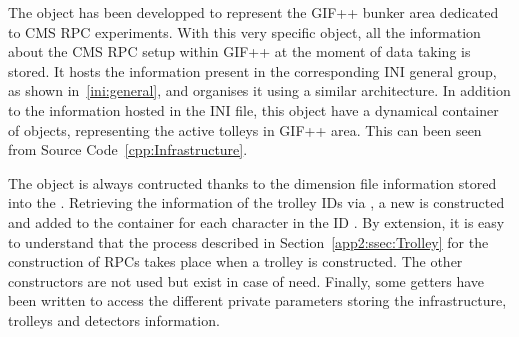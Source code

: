 	The  object has been developped to represent the GIF++ bunker area dedicated to CMS RPC experiments. With this very specific object, all the information about the CMS RPC setup within GIF++ at the moment of data taking is stored. It hosts the information present in the corresponding INI general group, as shown in~\ref{ini:general}, and organises it using a similar architecture. In addition to the information hosted in the INI file, this object have a dynamical container of  objects, representing the active tolleys in GIF++ area. This can been seen from Source Code~\ref{cpp:Infrastructure}.
	
	The  object is always contructed thanks to the dimension file information stored into the . Retrieving the information of the trolley IDs via , a new  is constructed and added to the container  for each character in the ID . By extension, it is easy to understand that the process described in Section~\ref{app2:ssec:Trolley} for the construction of RPCs takes place when a trolley is constructed. The other constructors are not used but exist in case of need. Finally, some getters have been written to access the different private parameters storing the infrastructure, trolleys and detectors information.\\
	
